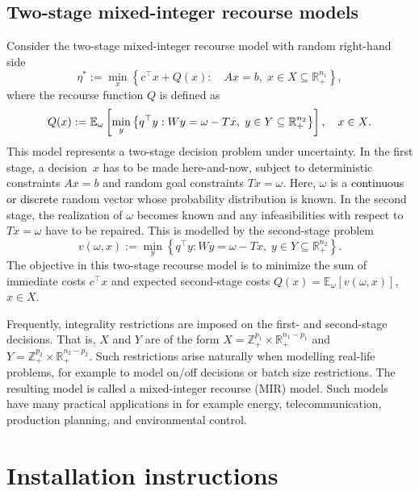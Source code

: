 \documentclass[12pt, english]{article}
\newcommand{\red}{\textcolor{black}}
\begin{document}
\subsection{Two-stage mixed-integer recourse models\label{subsec:model}}
Consider the two-stage mixed-integer recourse model with random right-hand side \begin{equation}\label{etastar}\eta^* := \min_{x}\left\{c^{\top}x + Q(x) :\quad Ax = b,\;x \in X\subseteq \mathbb{R}^{n_1}_+\right\},\end{equation} where the recourse function $Q$ is defined as \begin{equation}\label{defQ}Q(x):=\mathbb{E}_{\omega}\left[ \min_y \left\{   q^{\top}y: Wy = \omega - Tx,\; y \in Y \subseteq \mathbb R^{n_2 }_+\right\}\right]  , \quad x\in \red{X}. \end{equation}This model represents a two-stage decision problem under uncertainty. In the first stage, a decision~$x$ has to be made here-and-now, subject to deterministic constraints $Ax = b$ and random goal constraints $Tx = \omega$. Here, $\omega$ is a \red{continuous or discrete} random vector whose probability distribution is known. In the second stage, the realization of $\omega$ becomes known and any infeasibilities with respect to $Tx = \omega$ have to be repaired. This is modelled by the second-stage problem \begin{equation}\label{vwx}v(\omega,x) := \min_y \left\{   q^{\top}y:Wy = \omega - Tx,\; y \in Y \subseteq  \mathbb{R} ^{n_2 }_+\right\}.\end{equation}The objective in this two-stage recourse model is to minimize the sum of immediate costs $c^{\top}x$ and expected second-stage costs $Q(x) = \mathbb{E}_\omega[v(\omega,x)]$, ${x \in X}$.

Frequently, integrality restrictions are imposed on the first- and second-stage decisions. That is, $X$ and $Y$ are of the form $X = \mathbb Z^{p_1}_+ \times \mathbb{R}^{n_1 - p_1}_+$ and $Y = \mathbb Z^{p_2}_+\times \mathbb{R}^{n_2 - p_2}_+$. Such restrictions arise naturally when modelling real-life problems, for example to model on/off decisions or batch size restrictions. The resulting model is called a mixed-integer recourse (MIR) model.
Such models have many practical applications in for example energy, telecommunication, production planning, and environmental control.

\section{Installation instructions}
\label{sec:installation_instructions}
\end{document}
